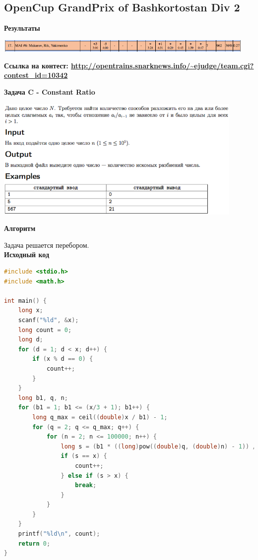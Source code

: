 \documentclass[a4paper,12pt]{article}
\begin{document}
%
%
\newpage
\subsection{OpenCup GrandPrix of Bashkortostan Div 2}

\textbf{{\large Результаты}} \\
\begin{center}
\includegraphics[width=0.95\textwidth]{OC_Bashkortostan/result.png}\\ [1cm]
\end{center}

\textbf{{\large Ссылка на контест: \url{http://opentrains.snarknews.info/~ejudge/team.cgi?contest_id=10342}}}

\newpage
\textbf{{\large Задача C - Constant Ratio}}

\begin{center}
\includegraphics[width=0.9\textwidth]{OC_Bashkortostan/C.png}\\ [1cm]
\end{center}

\textbf{{\large Алгоритм}}

Задача решается перебором. \\

\textbf{{\large Исходный код}} \\
\begin{lstlisting}[language=C++]
#include <stdio.h>
#include <math.h>

int main() {
    long x;
    scanf("%ld", &x); 
    long count = 0; 
    long d;
    for (d = 1; d < x; d++) {
        if (x % d == 0) {
            count++;
        }
    } 
    long b1, q, n;
    for (b1 = 1; b1 <= (x/3 + 1); b1++) {
        long q_max = ceil((double)x / b1) - 1;     
        for (q = 2; q <= q_max; q++) {
            for (n = 2; n <= 100000; n++) {
                long s = (b1 * ((long)pow((double)q, (double)n) - 1)) / (q - 1);
                if (s == x) {
                    count++;
                } else if (s > x) {
                    break;
                }
            }
        }
    }   
    printf("%ld\n", count);  
    return 0;
}
\end{lstlisting}
\end{document}
